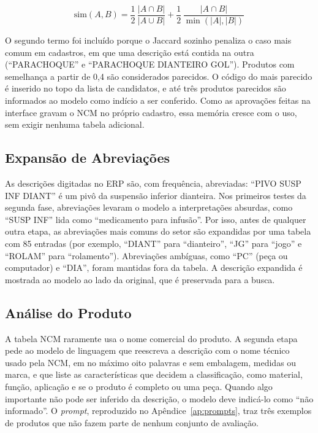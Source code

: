 \begin{equation}
\label{eq:similaridade}
\mathrm{sim}(A, B) = \frac{1}{2}\,\frac{|A \cap B|}{|A \cup B|} + \frac{1}{2}\,\frac{|A \cap B|}{\min(|A|, |B|)}
\end{equation}

O segundo termo foi incluído porque o Jaccard sozinho penaliza o caso mais comum em cadastros, em que uma descrição está contida na outra (``PARACHOQUE'' e ``PARACHOQUE DIANTEIRO GOL''). Produtos com semelhança a partir de 0,4 são considerados parecidos. O código do mais parecido é inserido no topo da lista de candidatos, e até três produtos parecidos são informados ao modelo como indício a ser conferido. Como as aprovações feitas na interface gravam o NCM no próprio cadastro, essa memória cresce com o uso, sem exigir nenhuma tabela adicional.

\subsection{Expansão de Abreviações}

As descrições digitadas no ERP são, com frequência, abreviadas: ``PIVO SUSP INF DIANT'' é um pivô da suspensão inferior dianteira. Nos primeiros testes da segunda fase, abreviações levaram o modelo a interpretações absurdas, como ``SUSP INF'' lida como ``medicamento para infusão''. Por isso, antes de qualquer outra etapa, as abreviações mais comuns do setor são expandidas por uma tabela com 85 entradas (por exemplo, ``DIANT'' para ``dianteiro'', ``JG'' para ``jogo'' e ``ROLAM'' para ``rolamento''). Abreviações ambíguas, como ``PC'' (peça ou computador) e ``DIA'', foram mantidas fora da tabela. A descrição expandida é mostrada ao modelo ao lado da original, que é preservada para a busca.

\subsection{Análise do Produto}

A tabela NCM raramente usa o nome comercial do produto. A segunda etapa pede ao modelo de linguagem que reescreva a descrição com o nome técnico usado pela NCM, em no máximo oito palavras e sem embalagem, medidas ou marca, e que liste as características que decidem a classificação, como material, função, aplicação e se o produto é completo ou uma peça. Quando algo importante não pode ser inferido da descrição, o modelo deve indicá-lo como ``não informado''. O \textit{prompt}, reproduzido no Apêndice~\ref{ap:prompts}, traz três exemplos de produtos que não fazem parte de nenhum conjunto de avaliação.

